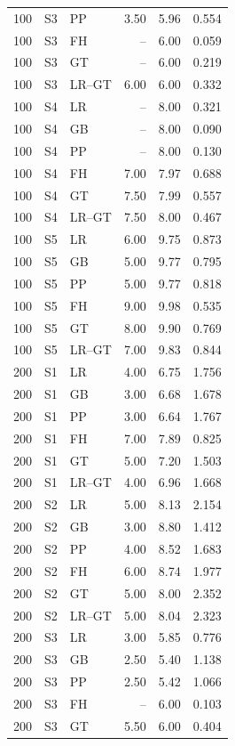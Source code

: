 \documentclass[12pt]{article}
\theoremstyle{definition}
\theoremstyle{remark}
\begin{document}
\begin{longtable}{rclrrr}
100 & S3 & PP & 3.50 & 5.96 & 0.554 \\
100 & S3 & FH & -- & 6.00 & 0.059 \\
100 & S3 & GT & -- & 6.00 & 0.219 \\
100 & S3 & LR--GT & 6.00 & 6.00 & 0.332 \\
100 & S4 & LR & -- & 8.00 & 0.321 \\
100 & S4 & GB & -- & 8.00 & 0.090 \\
100 & S4 & PP & -- & 8.00 & 0.130 \\
100 & S4 & FH & 7.00 & 7.97 & 0.688 \\
100 & S4 & GT & 7.50 & 7.99 & 0.557 \\
100 & S4 & LR--GT & 7.50 & 8.00 & 0.467 \\
100 & S5 & LR & 6.00 & 9.75 & 0.873 \\
100 & S5 & GB & 5.00 & 9.77 & 0.795 \\
100 & S5 & PP & 5.00 & 9.77 & 0.818 \\
100 & S5 & FH & 9.00 & 9.98 & 0.535 \\
100 & S5 & GT & 8.00 & 9.90 & 0.769 \\
100 & S5 & LR--GT & 7.00 & 9.83 & 0.844 \\
200 & S1 & LR & 4.00 & 6.75 & 1.756 \\
200 & S1 & GB & 3.00 & 6.68 & 1.678 \\
200 & S1 & PP & 3.00 & 6.64 & 1.767 \\
200 & S1 & FH & 7.00 & 7.89 & 0.825 \\
200 & S1 & GT & 5.00 & 7.20 & 1.503 \\
200 & S1 & LR--GT & 4.00 & 6.96 & 1.668 \\
200 & S2 & LR & 5.00 & 8.13 & 2.154 \\
200 & S2 & GB & 3.00 & 8.80 & 1.412 \\
200 & S2 & PP & 4.00 & 8.52 & 1.683 \\
200 & S2 & FH & 6.00 & 8.74 & 1.977 \\
200 & S2 & GT & 5.00 & 8.00 & 2.352 \\
200 & S2 & LR--GT & 5.00 & 8.04 & 2.323 \\
200 & S3 & LR & 3.00 & 5.85 & 0.776 \\
200 & S3 & GB & 2.50 & 5.40 & 1.138 \\
200 & S3 & PP & 2.50 & 5.42 & 1.066 \\
200 & S3 & FH & -- & 6.00 & 0.103 \\
200 & S3 & GT & 5.50 & 6.00 & 0.404 \\

\end{longtable}
\end{document}
